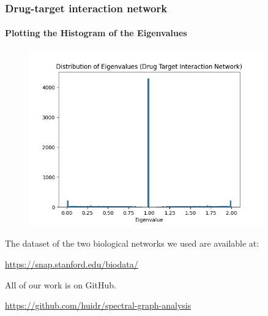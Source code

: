 \documentclass[aspectratio=43,leqno]{beamer}
\begin{document}
\begin{frame}
    \frametitle{Drug-target interaction network}
  \framesubtitle{Plotting the Histogram of the Eigenvalues}

 \begin{figure}[h]
    \centering
    \includegraphics[width=0.9\textwidth]{images/chg-hist.jpeg}
    \label{fig:mesh1}
  \end{figure}
  
\end{frame}

\begin{frame}
  \vfill
  The dataset of the two biological networks we used are available at:

  {\color{blue} \hyperref{https://snap.stanford.edu/biodata/}{}{}{https://snap.stanford.edu/biodata/} }
  \vfill
\end{frame}

\begin{frame}

  \vfill
  All of our work is on GitHub.
  
  {\color{blue} \hyperref{https://github.com/huidr/spectral-graph-analysis}{}{}{https://github.com/huidr/spectral-graph-analysis} }

  \vfill
  
\end{frame}

\end{document}
